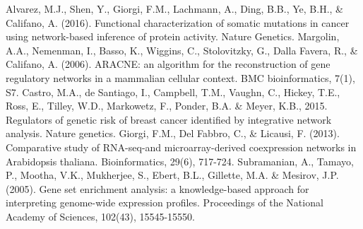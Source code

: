 \documentclass{article}
\begin{document}
\begin{thebibliography}{99}
 Alvarez, M.J., Shen, Y., Giorgi, F.M., Lachmann, A., Ding, B.B., Ye, B.H., \& Califano, A. (2016). Functional characterization of somatic mutations in cancer using network-based inference of protein activity. Nature Genetics.
 Margolin, A.A., Nemenman, I., Basso, K., Wiggins, C., Stolovitzky, G., Dalla Favera, R., \& Califano, A. (2006). ARACNE: an algorithm for the reconstruction of gene regulatory networks in a mammalian cellular context. BMC bioinformatics, 7(1), S7.
 Castro, M.A., de Santiago, I., Campbell, T.M., Vaughn, C., Hickey, T.E., Ross, E., Tilley, W.D., Markowetz, F., Ponder, B.A. \& Meyer, K.B., 2015. Regulators of genetic risk of breast cancer identified by integrative network analysis. Nature genetics.
 Giorgi, F.M., Del Fabbro, C., \& Licausi, F. (2013). Comparative study of RNA-seq-and microarray-derived coexpression networks in Arabidopsis thaliana. Bioinformatics, 29(6), 717-724.
 Subramanian, A., Tamayo, P., Mootha, V.K., Mukherjee, S., Ebert, B.L., Gillette, M.A. \& Mesirov, J.P. (2005). Gene set enrichment analysis: a knowledge-based approach for interpreting genome-wide expression profiles. Proceedings of the National Academy of Sciences, 102(43), 15545-15550.
\end{thebibliography}
\end{document}
